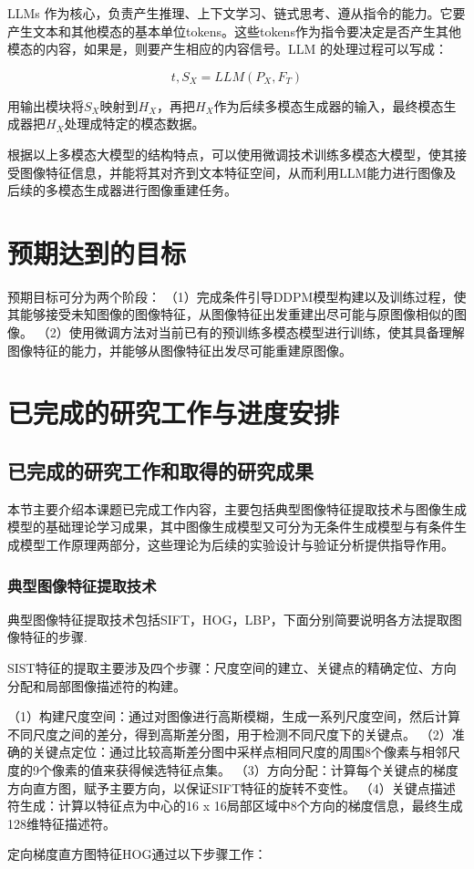 LLMs 作为核心，负责产生推理、上下文学习、链式思考、遵从指令的能力。它要产生文本和其他模态的基本单位tokens。这些tokens作为指令要决定是否产生其他模态的内容，如果是，则要产生相应的内容信号。LLM 的处理过程可以写成：

\begin{equation}\label{eqn-10}
      t,S_X = LLM(P_X,F_T)
\end{equation}

用输出模块将$S_X$映射到$H_X$，再把$H_X$作为后续多模态生成器的输入，最终模态生成器把$H_X$处理成特定的模态数据。
\par
根据以上多模态大模型的结构特点，可以使用微调技术训练多模态大模型，使其接受图像特征信息，并能将其对齐到文本特征空间，从而利用LLM能力进行图像及后续的多模态生成器进行图像重建任务。
\section{预期达到的目标}
预期目标可分为两个阶段：
（1）完成条件引导DDPM模型构建以及训练过程，使其能够接受未知图像的图像特征，从图像特征出发重建出尽可能与原图像相似的图像。
（2）使用微调方法对当前已有的预训练多模态模型进行训练，使其具备理解图像特征的能力，并能够从图像特征出发尽可能重建原图像。


\section{已完成的研究工作与进度安排}
\subsection{已完成的研究工作和取得的研究成果}\label{sec:finishwork}
本节主要介绍本课题已完成工作内容，主要包括典型图像特征提取技术与图像生成模型的基础理论学习成果，其中图像生成模型又可分为无条件生成模型与有条件生成模型工作原理两部分，这些理论为后续的实验设计与验证分析提供指导作用。

\subsubsection{典型图像特征提取技术}
典型图像特征提取技术包括SIFT，HOG，LBP，下面分别简要说明各方法提取图像特征的步骤.

\par
SIST特征的提取主要涉及四个步骤：尺度空间的建立、关键点的精确定位、方向分配和局部图像描述符的构建。
\par
（1）构建尺度空间：通过对图像进行高斯模糊，生成一系列尺度空间，然后计算不同尺度之间的差分，得到高斯差分图，用于检测不同尺度下的关键点。
（2）准确的关键点定位：通过比较高斯差分图中采样点相同尺度的周围8个像素与相邻尺度的9个像素的值来获得候选特征点集。
（3）方向分配：‌计算每个关键点的梯度方向直方图，赋予主要方向，以保证SIFT特征的旋转不变性。
（4）关键点描述符生成：计算以特征点为中心的16 x 16局部区域中8个方向的梯度信息，最终生成128维特征描述符。
\par
定向梯度直方图特征HOG通过以下步骤工作：‌

